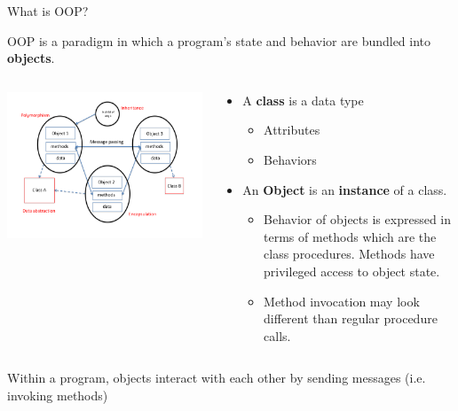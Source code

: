 \documentclass[11pt]{beamer}
\newcommand{\bi}{\begin{itemize}}
\newcommand{\ei}{\end{itemize}}
\begin{document}

\begin{frame}{What is OOP?} 

OOP is a paradigm in which a program's state and behavior are bundled into \textbf{objects}.
\begin{columns}
    \begin{column}{0.48\textwidth}
        
  \includegraphics[width=1.2\textwidth]{../../shared/oop_features.png} 

  \end{column}
  \begin{column}{0.48\textwidth}
\scriptsize{
    \begin{itemize}
        \item A \textbf{class} is a data type
        \bi
        		\item \scriptsize{Attributes}
		\item \scriptsize{Behaviors}
        \ei
        \item An \textbf{Object} is an \textbf{instance} of a class.
        \begin{itemize}
        \item \scriptsize{Behavior of objects is expressed in terms of methods which are the class procedures. Methods have privileged access to object state.}
        \item \scriptsize{Method invocation may look different than regular procedure calls.}
        \end{itemize}
    \end{itemize}
 }
  \end{column}
\end{columns}
\scriptsize{Within a program, objects interact with each other by sending messages (i.e. invoking methods)}

\end{frame} 
\end{document}
